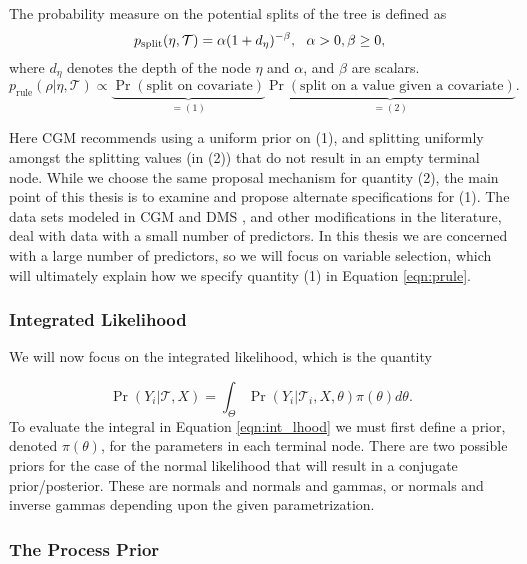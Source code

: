The probability measure on the potential splits of the tree is defined as
\begin{equation}\label{eqn:psplit}
p_{\text{split}}(\eta, \mathcal{T})=\alpha(1+d_{\eta})^{-\beta}, \ \ \alpha>0, \beta\geq 0,\\
\end{equation}
where $d_{\eta}$ denotes the depth of the node $\eta$ and $\alpha$, and $\beta$ are scalars. 
\begin{equation}\label{eqn:prule}
p_{\text{rule}}(\rho \vert \eta, \mathcal{T}) \propto \underbrace{\Pr(\text{split on covariate})}_{=(1)}\underbrace{\Pr(\text{split on a value given a covariate})}_{=(2)}. 
\end{equation}

Here CGM recommends using a uniform prior on (1), and splitting uniformly amongst the splitting values (in (2)) that do not result in an empty terminal node. While we choose the same proposal mechanism for quantity (2), the main point of this thesis is to examine and propose alternate specifications for (1). The data sets modeled in CGM \cite{chipman1998bayesian} and DMS \cite{denison1998bayesian}, and other modifications in the literature, deal with data with a small number of predictors. In this thesis we are concerned with a large number of predictors, so we will focus on variable selection, which will ultimately explain how we specify quantity (1) in Equation \ref{eqn:prule}. 

\subsubsection{Integrated Likelihood}
We will now focus on the integrated likelihood, which is the quantity 

\begin{equation}\label{eqn:int_lhood}
\Pr(Y_i \vert \mathcal{T}, X) = \int_{\Theta}\Pr(Y_i \vert \mathcal{T}_i, X, \theta)\pi(\theta)d\theta.
\end{equation}
To evaluate the integral in Equation \ref{eqn:int_lhood} we must first define a prior, denoted $\pi(\theta)$, for the parameters in each terminal node. 
There are two possible priors for the case of the normal likelihood that will result in a conjugate prior/posterior. These are normals and normals and gammas, or normals and inverse gammas depending upon the given parametrization. 


\subsubsection{The Process Prior}

